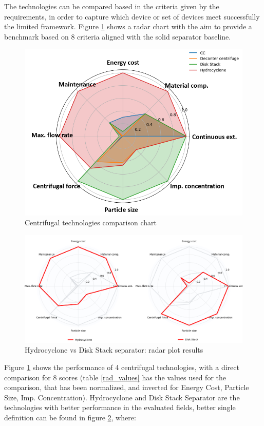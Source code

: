 \noindent The technologies can be compared based in the criteria given by the requirements, in order to capture which device or set of devices meet successfully the limited framework. Figure \ref{rad_chart} shows a radar chart with the aim to provide a benchmark based on 8 criteria aligned with the solid separator baseline.  

\begin{figure}[H]
	\centering
	\includegraphics[width=0.85\linewidth]{rad_chart.png}
	\captionsetup{font=bf, size=small}
	\caption{Centrifugal technologies comparison chart}
	\label{rad_chart}
\end{figure}
\begin{figure}[H]
	\centering
	\includegraphics[width=1\linewidth]{rad_chart_comp.png}
	\captionsetup{font=bf, size=small}
	\caption{Hydrocyclone vs Disk Stack separator: radar plot results}
	\label{rad_chart_comp}
\end{figure}

\noindent Figure \ref{rad_chart} shows the performance of 4 centrifugal technologies, with a direct comparison for 8 scores (table \ref{rad_values} has the values used for the comparison, that has been normalized, and inverted for Energy Cost, Particle Size, Imp. Concentration). Hydrocyclone and Disk Stack Separator are the technologies with better performance in the evaluated fields, better single definition can be found in figure \ref{rad_chart_comp}, where:

